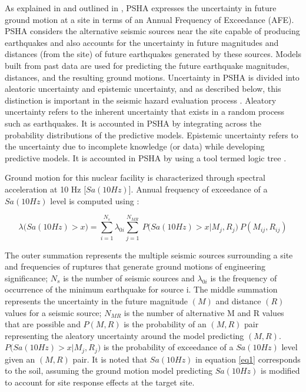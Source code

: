 \documentclass[3p]{elsarticle}
\begin{document}
As explained in \citet{Cornell1968} and outlined in \citet{McGuire2008}, PSHA expresses the uncertainty in future ground motion at a site in terms of an Annual Frequency of Exceedance (AFE). PSHA considers the alternative seismic sources near the site capable of producing earthquakes and also accounts for the uncertainty in future magnitudes and distances (from the site) of future earthquakes generated by these sources. Models built from past data are used for predicting the future earthquake magnitudes, distances, and the resulting ground motions. Uncertainty in PSHA is divided into aleatoric uncertainty and epistemic uncertainty, and as described below, this distinction is important in the seismic hazard evaluation process \cite{Budnitz1997}. Aleatory uncertainty refers to the inherent uncertainty that exists in a random process such as earthquakes. It is accounted in PSHA by integrating across the probability distributions of the predictive models. Epistemic uncertainty refers to the uncertainty due to incomplete knowledge (or data) while developing predictive models. It is accounted in PSHA by using a tool termed logic tree \cite{Bommer2008}. 

Ground motion for this nuclear facility is characterized through spectral acceleration at 10 Hz [$Sa(10Hz)$]. Annual frequency of exceedance of a $Sa(10Hz)$ level is computed using \cite{Baker2008}:

\begin{equation}
\label{eq1}
\lambda\big(Sa(10Hz) > x\big) = \sum_{i=1}^{N_s} \lambda_{0i} \sum_{j = 1}^{N_{MR}}~P\big(Sa(10Hz) > x|M_{j},R_{j}\big)~P(M_{ij}, R_{ij})
\end{equation}

\noindent The outer summation represents the multiple seismic sources surrounding a site and frequencies of ruptures that generate ground motions of engineering significance; $N_s$ is the number of seismic sources and $\lambda_{0i}$ is the frequency of occurrence of the minimum earthquake for source i. The middle summation represents the uncertainty in the future magnitude $(M)$ and distance $(R)$ values for a seismic source; $N_{MR}$ is the number of alternative M and R values that are possible and $P(M,R)$ is the probability of an $(M,R)$ pair representing the aleatory uncertainty around the model predicting $(M,R)$. $P\big(Sa(10Hz) > x|M_{j},R_{j}\big)$ is the probability of exceedance of a $Sa(10Hz)$ level given an $(M,R)$ pair. It is noted that $Sa(10Hz)$ in equation \eqref{eq1} corresponds to the soil, assuming the ground motion model predicting $Sa(10Hz)$ is modified to account for site response effects at the target site.
\end{document}
